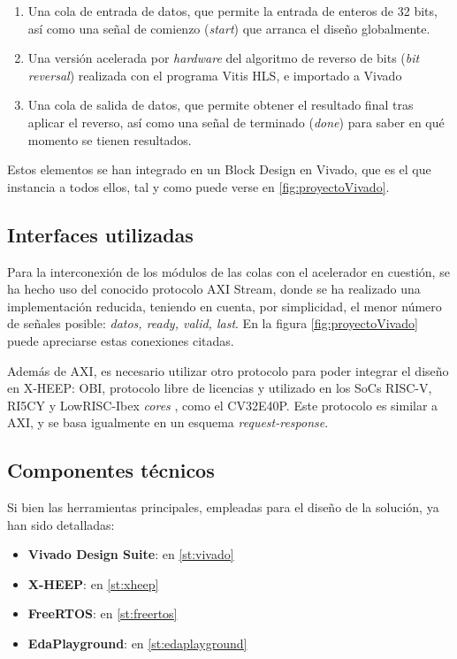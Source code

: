 \begin{enumerate}
    \item Una cola de entrada de datos, que permite la entrada de enteros de 32 bits, así como una señal de comienzo (\emph{start}) que arranca el diseño globalmente.
    \item Una versión acelerada por \textit{hardware} del algoritmo de reverso de bits (\emph{bit reversal}) realizada con el programa Vitis HLS, e importado a Vivado
    \item Una cola de salida de datos, que permite obtener el resultado final tras aplicar el reverso, así como una señal de terminado (\emph{done}) para saber en qué momento se tienen resultados.
\end{enumerate}

Estos elementos se han integrado en un Block Design en Vivado, que es el que instancia a todos ellos, tal y como puede verse en \ref{fig:proyectoVivado}.

\subsection{Interfaces utilizadas}
Para la interconexión de los módulos de las colas con el acelerador en cuestión, se ha hecho uso del conocido protocolo \ac{AXI} Stream, donde se ha realizado una implementación reducida, teniendo en cuenta, por simplicidad, el menor número de señales posible: \emph{datos, ready, valid, last}. En la figura \ref{fig:proyectoVivado} puede apreciarse estas conexiones citadas.

Además de AXI, es necesario utilizar otro protocolo para poder integrar el diseño en X-HEEP: \ac{OBI}, protocolo libre de licencias y utilizado en los SoCs RISC-V, RI5CY y LowRISC-Ibex \textit{cores} \cite{infoOBI}, como el CV32E40P. Este protocolo es similar a AXI, y se basa igualmente en un esquema \emph{request-response}.

\subsection{Componentes técnicos}
Si bien las herramientas principales, empleadas para el diseño de la solución, ya han sido detalladas:

\begin{itemize}
    \item \textbf{Vivado Design Suite}: en \ref{st:vivado}
    \item \textbf{X-HEEP}: en \ref{st:xheep}
    \item \textbf{FreeRTOS}: en \ref{st:freertos}
    \item \textbf{EdaPlayground}: en \ref{st:edaplayground}
\end{itemize}

